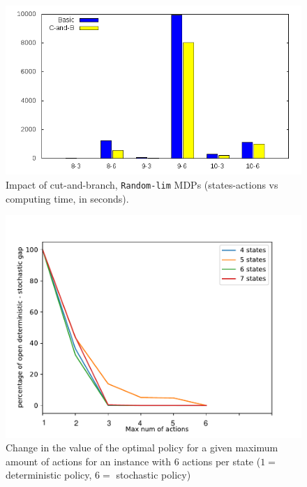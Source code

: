\begin{figure}[]
	\begin{center}
    \includegraphics[scale=0.45]{GNUPLOT/output_trident.png}
	\end{center}
	\caption{Impact of cut-and-branch, \texttt{Random-lim} MDPs (states-actions vs computing time, in seconds).}
	\label{fig:impact_trident} 
\end{figure}

\begin{figure}[]
	\begin{center}
    \includegraphics[scale=0.55]{images/comparison.pdf}
	\end{center}
	\caption{Change in the value of the optimal policy for a given maximum amount of actions for an instance with $6$ actions per state ($1 =$ deterministic policy, $6 =$ stochastic policy)}
	\label{fig:impact_mixed_policy} 
\end{figure}




